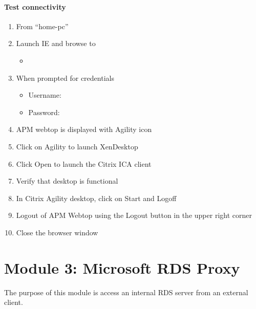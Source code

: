 \documentclass[letterpaper,10pt,english]{sphinxmanual}
\begin{document}
\paragraph{Test connectivity}
\label{\detokenize{class2/module2/lab1:id2}}\begin{enumerate}
\item {} 
From “home-pc”

\item {} 
Launch IE and browse to
\begin{itemize}
\item {} 

\end{itemize}

\item {} 
When prompted for credentials
\begin{itemize}
\item {} 
Username: 

\item {} 
Password: 

\end{itemize}

\item {} 
APM webtop is displayed with Agility icon

\item {} 
Click on Agility to launch XenDesktop

\item {} 
Click Open to launch the Citrix ICA client 

\item {} 
Verify that desktop is functional

\item {} 
In Citrix Agility desktop, click on Start and Logoff

\item {} 
Logout of APM Webtop using the Logout button in the upper right
corner

\item {} 
Close the browser window

\end{enumerate}


\section{Module 3: Microsoft RDS Proxy}
\label{\detokenize{class2/module3/module3::doc}}\label{\detokenize{class2/module3/module3:module-3-microsoft-rds-proxy}}
The purpose of this module is access an internal RDS server from an
external client.
\end{document}
